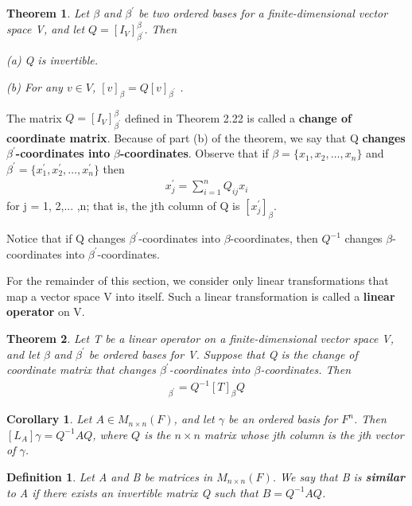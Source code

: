 \documentclass{article}
\newcommand{\bd}[1]{\textbf{#1}}
\theoremstyle{plain}
\newtheorem{theorem}{Theorem}[section]
\newtheorem*{corollary}{Corollary}
\newtheorem*{definition1}{Definition}
\theoremstyle{plain} %
\begin{document}
\begin{theorem}
Let $\beta$ and $\beta^\prime$ be two ordered bases for a finite-dimensional vector space V, and let $Q = [I_V]^\beta_{\beta^\prime}$. Then

(a) Q is invertible.

(b) For any $v \in V$, $[v]_\beta = Q[v]_{\beta^\prime}$ .
\end{theorem}

The matrix $Q = [I_V]^\beta_{\beta^\prime}$ defined in Theorem 2.22 is called a \bd{change of coordinate matrix}. Because of part (b) of the theorem, we say that Q \bd{changes} $\beta^\prime$\bd{-coordinates into} $\beta$\bd{-coordinates}. Observe that if $\beta = \{x_1, x_2,\ldots ,x_n\}$ and $\beta^\prime = \{x_1^\prime, x_2^\prime,\ldots,x_n^\prime\}$ then
\begin{align*}
x^\prime_j = \sum_{i=1}^n Q_{ij}x_i
\end{align*}
for j = 1, 2,... ,n; that is, the jth column of Q is $[x^\prime_j]_\beta$.

Notice that if Q changes $\beta^\prime$-coordinates into $\beta$-coordinates, then $Q^{-1}$ changes $\beta$-coordinates into $\beta^\prime$-coordinates.

For the remainder of this section, we consider only linear transformations that map a vector space V into itself. Such a linear transformation is called a \bd{linear operator} on V. 

\begin{theorem}
Let T be a linear operator on a finite-dimensional vector space V, and let $\beta$ and $\beta^\prime$  be ordered bases for V. Suppose that Q is the change of coordinate matrix that changes $\beta^\prime$-coordinates into $\beta$-coordinates. Then
\begin{align*}
[T]_{\beta^\prime}=Q^{-1}[T]_\beta Q
\end{align*}
\end{theorem}

\begin{corollary}
Let $A \in M_{n\times n}(F)$, and let $\gamma$ be an ordered basis for $F^n$. Then $[L_A]\gamma = Q^{-1}AQ$, where $Q$ is the $n \times n$ matrix whose jth column is the jth vector of $\gamma$.
\end{corollary}

\begin{definition1}
Let A and B be matrices in $M_{n\times n}(F)$. We say that B is \bd{similar} to A if there exists an invertible matrix Q such that $B=Q^{-1}AQ$.
\end{definition1}
\end{document}

